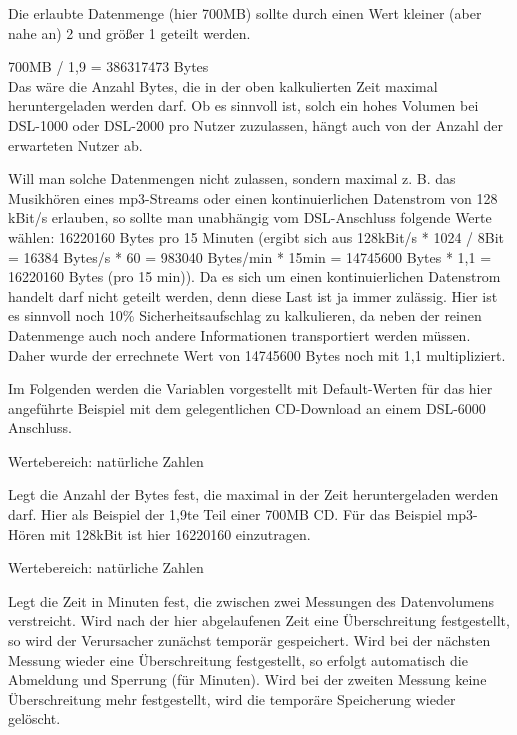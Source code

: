 \begin{description}
\begin{tabular}{lrlrl}
   \end{tabular}

   Die erlaubte Datenmenge (hier 700MB) sollte durch einen Wert kleiner (aber nahe an) 2 und größer 1 geteilt werden.
 
    700MB / 1,9 = 386317473 Bytes \\
   Das wäre die Anzahl Bytes, die in der oben kalkulierten Zeit maximal heruntergeladen werden darf. Ob es
   sinnvoll ist, solch ein hohes Volumen bei DSL-1000 oder DSL-2000 pro Nutzer zuzulassen, hängt auch von
   der Anzahl der erwarteten Nutzer ab.

   Will man solche Datenmengen nicht zulassen, sondern maximal z. B. das Musikhören eines mp3-Streams oder
   einen kontinuierlichen Datenstrom von 128 kBit/s erlauben, so sollte man unabhängig vom DSL-Anschluss
   folgende Werte wählen: 16220160 Bytes pro 15 Minuten (ergibt sich aus 128kBit/s * 1024 / 8Bit = 16384
   Bytes/s * 60 = 983040 Bytes/min * 15min = 14745600 Bytes * 1,1 = 16220160 Bytes (pro 15 min)).
   Da es sich um einen kontinuierlichen Datenstrom handelt darf nicht geteilt werden, denn diese Last ist
   ja immer zulässig. Hier ist es sinnvoll noch 10\% Sicherheitsaufschlag zu kalkulieren, da neben der
   reinen Datenmenge auch noch andere Informationen transportiert werden müssen. Daher wurde der errechnete
   Wert von 14745600 Bytes noch mit 1,1 multipliziert.

   Im Folgenden werden die Variablen vorgestellt mit Default-Werten für das hier angeführte Beispiel mit dem
   gelegentlichen CD-Download an einem DSL-6000 Anschluss.
   
   
   
   Wertebereich: natürliche Zahlen
   
   Legt die Anzahl der Bytes fest, die maximal in der Zeit 
   {} heruntergeladen werden darf. Hier als Beispiel der 1,9te Teil einer
   700MB CD. Für das Beispiel mp3-Hören mit 128kBit ist hier 16220160 einzutragen.
   
   
   
   Wertebereich: natürliche Zahlen

   Legt die Zeit in Minuten fest, die zwischen zwei Messungen des Datenvolumens verstreicht. Wird nach der
   hier abgelaufenen Zeit eine Überschreitung festgestellt, so wird der Verursacher zunächst temporär
   gespeichert. Wird bei der nächsten Messung wieder eine Überschreitung festgestellt, so erfolgt automatisch
   die Abmeldung und Sperrung (für  Minuten).
   Wird bei der zweiten Messung keine Überschreitung mehr festgestellt, wird die temporäre Speicherung wieder
   gelöscht.


\end{description}

